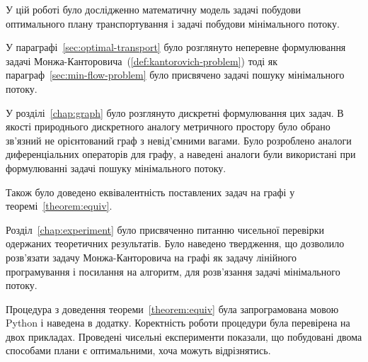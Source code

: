 У цій роботі було дослідженно математичну модель задачі побудови оптимального плану транспортування і
задачі побудови мінімального потоку.

У параграфі~\ref{sec:optimal-transport} було розглянуто неперевне формулювання 
задачі Монжа-Канторовича~(\ref{def:kantorovich-problem}) тоді як параграф~\ref{sec:min-flow-problem}
було присвячено задачі пошуку мінімального потоку.

У розділі~\ref{chap:graph} було розглянуто дискретні формулювання цих задач. В якості природнього дискретного аналогу
метричного простору було обрано зв'язний не орієнтований граф з невід'ємними вагами. Було розроблено аналоги
диференціальних операторів для графу, а наведені аналоги були використані при формулюванні задачі пошуку мінімального потоку.

Також було доведено еквівалентність поставлених задач на графі у теоремі~\ref{theorem:equiv}.

Розділ~\ref{chap:experiment} було присвяченно питанню чисельної перевірки одержаних теоретичних результатів. Було
наведено твердження, що дозволило розв'язати задачу Монжа-Канторовича на графі як задачу
лінійного програмування і посилання на алгоритм, для розв'язання задачі мінімального потоку.

Процедура з доведення теореми~\ref{theorem:equiv} була запрограмована мовою Python і наведена в додатку.
Коректність роботи процедури була перевірена на двох прикладах. 
Проведені чисельні експерименти показали, що побудовані двома способами плани є оптимальними, хоча можуть відрізнятись.